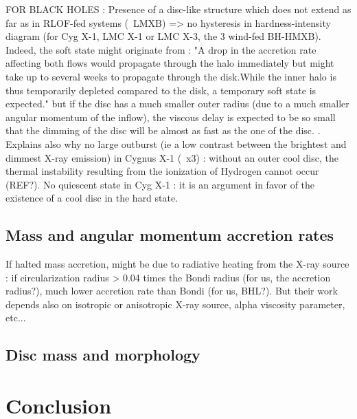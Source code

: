 \documentclass[a4paper,fleqn,usenatbib]{mnras}
\begin{document}
FOR BLACK HOLES :
Presence of a disc-like structure which does not extend as far as in RLOF-fed systems (~LMXB) => no hysteresis in hardness-intensity diagram (for Cyg X-1, LMC X-1 or LMC X-3, the 3 wind-fed BH-HMXB). Indeed, the soft state might originate from : "A drop in the accretion rate affecting both flows would propagate through the halo immediately but might take up to several weeks to propagate through the disk.While the inner halo is thus temporarily depleted compared to the disk, a temporary soft state is expected." but if the disc has a much smaller outer radius (due to a much smaller angular momentum of the inflow), the viscous delay is expected to be so small that the dimming of the disc will be almost as fast as the one of the disc. \citep{Smith2002}. Explains also why no large outburst (ie a low contrast between the brightest and dimmest X-ray emission) in Cygnus X-1 (~x3) \citep{Grinberg:2014ux} : without an outer cool disc, the thermal instability resulting from the ionization of Hydrogen cannot occur (REF?). No quiescent state in Cyg X-1 : it is an argument in favor of the existence of a cool disc in the hard state.

\subsection{Mass and angular momentum accretion rates}
\label{sec:mdot_ldot}

If halted mass accretion, might be due to radiative heating from the X-ray source \citep{Sugimura2018} : if circularization radius > 0.04 times the Bondi radius (for us, the accretion radius?), much lower accretion rate than Bondi (for us, BHL?). But their work depends also on isotropic or anisotropic X-ray source, alpha viscosity parameter, etc...

\subsection{Disc mass and morphology}
\label{sec:disc}

\section{Conclusion}
\label{sec:conc}
\end{document}
